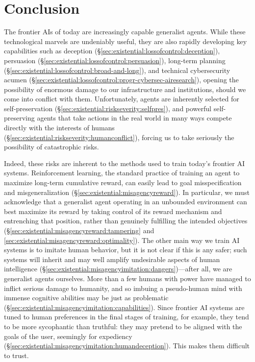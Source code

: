\section{Conclusion}
\label{sec:conclusion}

The frontier AIs of today are increasingly capable generalist agents.
While these technological marvels are undeniably useful, 
they are also rapidly developing key capabilities such as deception (\S\ref{sec:existential:lossofcontrol:deception}), persuasion (\S\ref{sec:existential:lossofcontrol:persuasion}), long-term planning (\S\ref{sec:existential:lossofcontrol:broad-and-long}), and technical cybersecurity acumen (\S\ref{sec:existential:lossofcontrol:progr-cybersec-airesearch}),
opening the possibility of enormous damage to our infrastructure and institutions, should we come into conflict with them.
Unfortunately, agents are inherently selected for self-preservation
(\S\ref{sec:existential:riskseverity:selfpres}),
and powerful self-preserving agents that take actions in the real world in many ways compete directly with the interests of humans
(\S\ref{sec:existential:riskseverity:humanconflict}),
forcing us to take seriously the possibility of catastrophic risks.

Indeed, these risks are inherent to the methods used to train today's frontier AI systems.
Reinforcement learning, the standard practice of training an agent to maximize long-term cumulative reward, can easily lead to goal misspecification and misgeneralization (\S\ref{sec:existential:misagencyreward}).
In particular, we must acknowledge that a generalist agent operating in an unbounded environment can best maximize its reward by taking control of its reward mechanism and entrenching that position, rather than genuinely fulfilling the intended objectives (\S\ref{sec:existential:misagencyreward:tampering} and \ref{sec:existential:misagencyreward:optimality}). 
%
The other main way we train AI systems is to imitate human behavior, but it is not clear if this is any safer; such systems will inherit and may well amplify undesirable aspects of human intelligence (\S\ref{sec:existential:misagencyimitation:dangers})---after all, we are generalist agents ourselves.
More than a few humans with power have managed to inflict serious damage to humanity, and so imbuing a pseudo-human mind with immense cognitive abilities may be just as problematic (\S\ref{sec:existential:misagencyimitation:capabilities}).
Since frontier AI systems are tuned to human preferences in the final stages of training, for example, they tend to be more sycophantic than truthful: they may pretend to be aligned with the goals of the user, seemingly for expediency (\S\ref{sec:existential:misagencyimitation:humandeception}).
This makes them difficult to trust.

